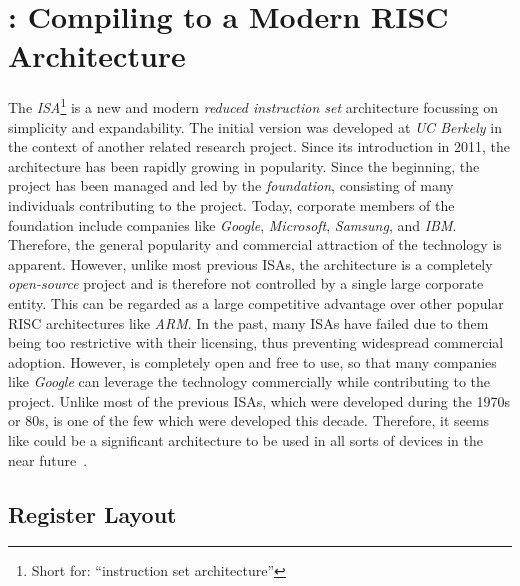 \newpage

\section{\riscv{}: Compiling to a Modern RISC Architecture}

The \emph{\riscv{}} \emph{ISA}\footnote{Short for: \enquote{instruction set architecture}} is a new and modern \emph{reduced instruction set} architecture focussing on simplicity and expandability.
The initial version was developed at \emph{UC Berkely} in the context of another related research project.
Since its introduction in 2011, the architecture has been rapidly growing in popularity.
Since the beginning, the project has been managed and led by the \emph{\riscv{} foundation}, consisting of many individuals contributing to the project.
Today, corporate members of the \riscv{} foundation include companies like \emph{Google}, \emph{Microsoft}, \emph{Samsung}, and \emph{IBM}.
Therefore, the general popularity and commercial attraction of the technology is apparent.
However, unlike most previous ISAs, the \riscv{} architecture is a completely \emph{open-source} project and is therefore not controlled by a single large corporate entity.
This can be regarded as a large competitive advantage over other popular RISC architectures like \emph{ARM}.
In the past, many ISAs have failed due to them being too restrictive with their licensing, thus preventing widespread commercial adoption.
However, \riscv{} is completely open and free to use, so that many companies like \emph{Google} can leverage the technology commercially while contributing to the project.
Unlike most of the previous ISAs, which were developed during the 1970s or 80s, \riscv{} is one of the few which were developed this decade.
Therefore, it seems like \riscv{} could be a significant architecture to be used in all sorts of devices in the near future~\cite[preface]{Patterson2017}.

\subsection{Register Layout}

